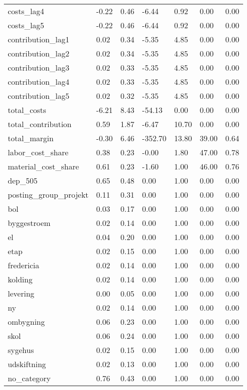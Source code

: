 \begin{landscape}
\begin{longtable}[h!]{lllllll}
costs_lag4 & -0.22 & 0.46 & -6.44 & 0.92 & 0.00 & 0.00 \\
costs_lag5 & -0.22 & 0.46 & -6.44 & 0.92 & 0.00 & 0.00 \\
contribution_lag1 & 0.02 & 0.34 & -5.35 & 4.85 & 0.00 & 0.00 \\
contribution_lag2 & 0.02 & 0.34 & -5.35 & 4.85 & 0.00 & 0.00 \\
contribution_lag3 & 0.02 & 0.33 & -5.35 & 4.85 & 0.00 & 0.00 \\
contribution_lag4 & 0.02 & 0.33 & -5.35 & 4.85 & 0.00 & 0.00 \\
contribution_lag5 & 0.02 & 0.32 & -5.35 & 4.85 & 0.00 & 0.00 \\
total_costs & -6.21 & 8.43 & -54.13 & 0.00 & 0.00 & 0.00 \\
total_contribution & 0.59 & 1.87 & -6.47 & 10.70 & 0.00 & 0.00 \\
total_margin & -0.30 & 6.46 & -352.70 & 13.80 & 39.00 & 0.64 \\
labor_cost_share & 0.38 & 0.23 & -0.00 & 1.80 & 47.00 & 0.78 \\
material_cost_share & 0.61 & 0.23 & -1.60 & 1.00 & 46.00 & 0.76 \\
dep_505 & 0.65 & 0.48 & 0.00 & 1.00 & 0.00 & 0.00 \\
posting_group_projekt & 0.11 & 0.31 & 0.00 & 1.00 & 0.00 & 0.00 \\
bol & 0.03 & 0.17 & 0.00 & 1.00 & 0.00 & 0.00 \\
byggestroem & 0.02 & 0.14 & 0.00 & 1.00 & 0.00 & 0.00 \\
el & 0.04 & 0.20 & 0.00 & 1.00 & 0.00 & 0.00 \\
etap & 0.02 & 0.15 & 0.00 & 1.00 & 0.00 & 0.00 \\
fredericia & 0.02 & 0.14 & 0.00 & 1.00 & 0.00 & 0.00 \\
kolding & 0.02 & 0.14 & 0.00 & 1.00 & 0.00 & 0.00 \\
levering & 0.00 & 0.05 & 0.00 & 1.00 & 0.00 & 0.00 \\
ny & 0.02 & 0.14 & 0.00 & 1.00 & 0.00 & 0.00 \\
ombygning & 0.06 & 0.23 & 0.00 & 1.00 & 0.00 & 0.00 \\
skol & 0.06 & 0.24 & 0.00 & 1.00 & 0.00 & 0.00 \\
sygehus & 0.02 & 0.15 & 0.00 & 1.00 & 0.00 & 0.00 \\
udskiftning & 0.02 & 0.13 & 0.00 & 1.00 & 0.00 & 0.00 \\
no_category & 0.76 & 0.43 & 0.00 & 1.00 & 0.00 & 0.00 \\

\end{longtable}
\end{landscape}
